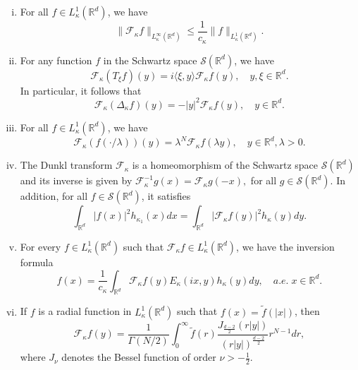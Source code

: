 \documentclass[a4paper,11pt, reqno]{amsart}
\theoremstyle{definition}
\theoremstyle{remark}
\numberwithin{equation}{section}
\begin{document}
	\begin{enumerate}[(i)]
		\item  For all $f\in L_\kappa^1\left(\mathbb{R}^{d}\right)$, we have
		\begin{equation*}
			\|\mathcal{F}_\kappa f\|_{L_\kappa^\infty\left(\mathbb{R}^{d}\right)}\leq \frac{1}{c_\kappa} \|f\|_{L_\kappa^1\left(\mathbb{R}^{d}\right)}.
		\end{equation*}
		\item For any function $f$ in the Schwartz space $\mathcal{S}\left(\mathbb{R}^{d}\right)$, we have
		\begin{equation*}
			\mathcal{F}_\kappa(T_\xi f)(y)=i\langle \xi, y\rangle \mathcal{F}_\kappa f(y),\quad y,\xi\in\mathbb{R}^{d}.
		\end{equation*}
		In particular, it follows that 
		\begin{equation*}
			\mathcal{F}_\kappa(\Delta_\kappa f)(y)=-|y|^2 \mathcal{F}_\kappa f(y),\quad y\in\mathbb{R}^{d}.
		\end{equation*}
		\item  For all $f\in L_\kappa^1\left(\mathbb{R}^{d}\right)$, we have
		\begin{equation*}
			\mathcal{F}_\kappa (f(\cdot/\lambda))(y)=\lambda^N\mathcal{F}_\kappa f(\lambda y),\quad y\in\mathbb{R}^{d}, \lambda>0.
		\end{equation*} 
		\item The Dunkl transform $\mathcal{F}_\kappa$ is a homeomorphism of the Schwartz space $\mathcal{S}\left(\mathbb{R}^{d}\right)$ and its inverse is given by $\mathcal{F}_\kappa^{-1}g(x)=\mathcal{F}_\kappa g(-x),$ for all $ g\in \mathcal{S}\left(\mathbb{R}^{d}\right)$. In addition, for all $f\in \mathcal{S}\left(\mathbb{R}^{d}\right)$, it satisfies
		\begin{equation*}
			\int_{\mathbb{R}^{d}} |f(x)|^2 h_{\kappa_1}(x)dx=\int_{\mathbb{R}^{d}} |\mathcal{F}_\kappa f(y)|^2 h_\kappa(y)dy.
		\end{equation*}
		\item For every $f\in L_\kappa^1\left(\mathbb{R}^{d}\right)$ such that $\mathcal{F}_\kappa f\in L_\kappa^1\left(\mathbb{R}^{d}\right)$, we have the inversion formula
		\begin{equation*}
			f(x)=\frac{1}{c_\kappa}\int_{\mathbb{R}^{d}} \mathcal{F}_\kappa f(y) E_\kappa(ix,y)h_\kappa(y)dy,\quad  a.e. \;x\in\mathbb{R}^{d}.
		\end{equation*}
		\item  If $f$ is a radial function in $ L_\kappa^1\left(\mathbb{R}^{d}\right)$ such that $f(x)=\tilde{f}(|x|)$, then
		\begin{equation}\label{radial-Dunkl}
			\mathcal{F}_\kappa f(y)=\frac{1}{\Gamma(N/2)}\int_0^\infty \tilde{f}(r)\frac{J_\frac{d-2}{2}(r|y|)}{\left(r|y|\right)^\frac{d-2}{2}}r^{N-1} dr,
		\end{equation}
		where $J_\nu$ denotes the Bessel function of order $\nu>-\frac{1}{2}$.
		

\end{enumerate}
\end{document}

